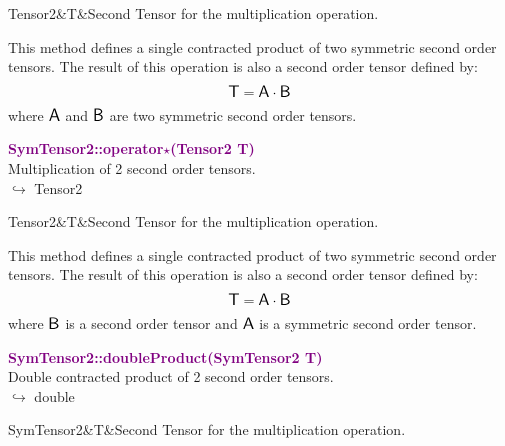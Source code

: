 \begin{tcolorbox}[width=\textwidth,myArgs,tabularx={ll|R}]
Tensor2&T&Second Tensor for the multiplication operation.
\end{tcolorbox}

This method defines a single contracted product of two symmetric second order tensors.
The result of this operation is also a second order tensor defined by:
\begin{equation*}
\mbox{\large\ensuremath{\mathsf{T}}} = \mbox{\large\ensuremath{\mathsf{A}}} \cdot \mbox{\large\ensuremath{\mathsf{B}}}
\end{equation*}
where $\mbox{\large\ensuremath{\mathsf{A}}}$ and $\mbox{\large\ensuremath{\mathsf{B}}}$ are two symmetric second order tensors.

\textcolor{purple}{\textbf{SymTensor2::operator$\star$(Tensor2 T)}}\label{SymTensor2::operator*(Tensor2 T)}\\
Multiplication of 2 second order tensors.\\ \hspace*{10mm}$\hookrightarrow$ Tensor2

\begin{tcolorbox}[width=\textwidth,myArgs,tabularx={ll|R}]
Tensor2&T&Second Tensor for the multiplication operation.
\end{tcolorbox}

This method defines a single contracted product of two symmetric second order tensors.
The result of this operation is also a second order tensor defined by:
\begin{equation*}
\mbox{\large\ensuremath{\mathsf{T}}} = \mbox{\large\ensuremath{\mathsf{A}}} \cdot \mbox{\large\ensuremath{\mathsf{B}}}
\end{equation*}
where $\mbox{\large\ensuremath{\mathsf{B}}}$ is a second order tensor and $\mbox{\large\ensuremath{\mathsf{A}}}$ is a symmetric second order tensor.

\textcolor{purple}{\textbf{SymTensor2::doubleProduct(SymTensor2 T)}}\label{SymTensor2::doubleProduct(SymTensor2 T)}\\
Double contracted product of 2 second order tensors.\\ \hspace*{10mm}$\hookrightarrow$ double

\begin{tcolorbox}[width=\textwidth,myArgs,tabularx={ll|R}]
SymTensor2&T&Second Tensor for the multiplication operation.
\end{tcolorbox}

